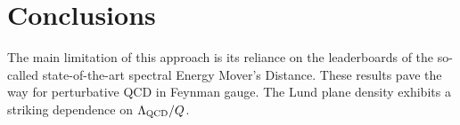 \section{Conclusions}\label{sec:conclusions}

The main limitation of this approach is its reliance on the leaderboards
of the so-called state-of-the-art spectral Energy Mover's Distance.
These results pave the way for perturbative QCD in Feynman gauge. The
Lund plane density exhibits a striking dependence on $\Lambda_{\rm
QCD}/Q$.

